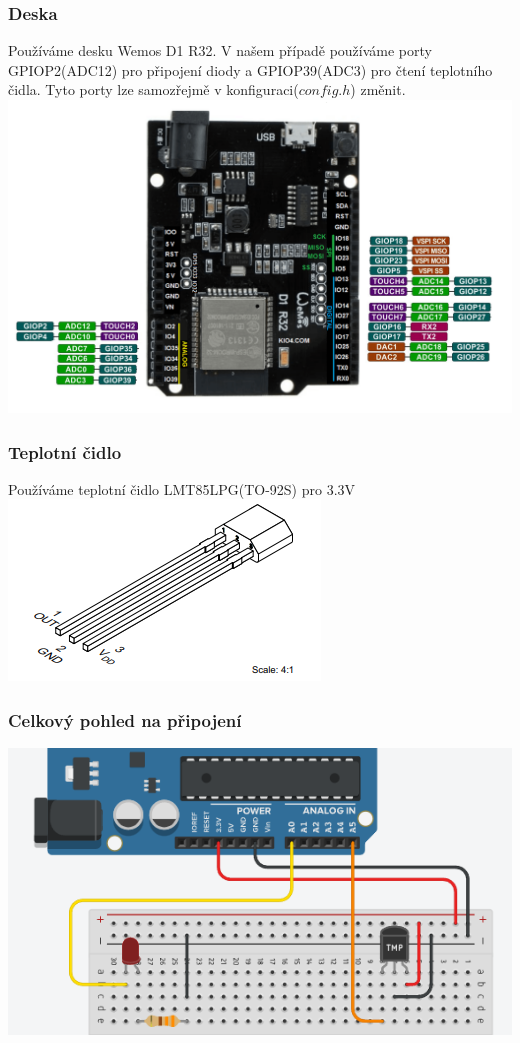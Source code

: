 \documentclass[12pt]{article}
\begin{document}
\subsubsection{Deska}
Používáme desku Wemos D1 R32. V našem případě používáme porty GPIOP2(ADC12) pro připojení diody a GPIOP39(ADC3) pro čtení teplotního čidla. Tyto porty lze samozřejmě v konfiguraci($config.h$) změnit. \\
{\includegraphics[width=0.7\linewidth]{wemos.png}}\\[50pt]

\subsubsection{Teplotní čidlo}
Používáme teplotní čidlo LMT85LPG(TO-92S) pro 3.3V\\
{\includegraphics[width=0.4\linewidth]{lmt85.png}}\\[50pt]

\subsubsection{Celkový pohled na připojení}
{\includegraphics[width=0.7\linewidth]{zap.png}}\\[50pt]
\end{document}
